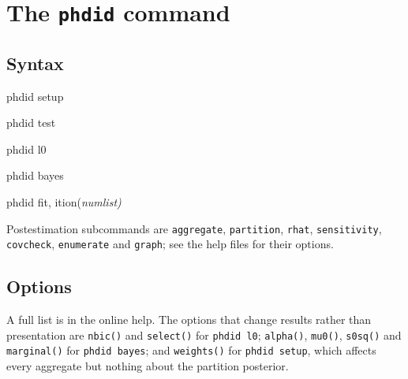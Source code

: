 \documentclass{sj}
\begin{document}
\section{The \texttt{phdid} command}

\subsection{Syntax}

\begin{stsyntax}
phdid setup
\end{stsyntax}

\begin{stsyntax}
phdid test
\end{stsyntax}

\begin{stsyntax}
phdid l0
\end{stsyntax}

\begin{stsyntax}
phdid bayes
\end{stsyntax}

\begin{stsyntax}
phdid fit, ition(\it{numlist})
\end{stsyntax}

Postestimation subcommands are \texttt{aggregate}, \texttt{partition},
\texttt{rhat}, \texttt{sensitivity}, \texttt{covcheck}, \texttt{enumerate} and
\texttt{graph}; see the help files for their options.

\subsection{Options}

A full list is in the online help.  The options that change results rather
than presentation are \texttt{nbic()} and \texttt{select()} for
\texttt{phdid l0}; \texttt{alpha()}, \texttt{mu0()}, \texttt{s0sq()} and
\texttt{marginal()} for \texttt{phdid bayes}; and \texttt{weights()} for
\texttt{phdid setup}, which affects every aggregate but nothing about the
partition posterior.
\end{document}
